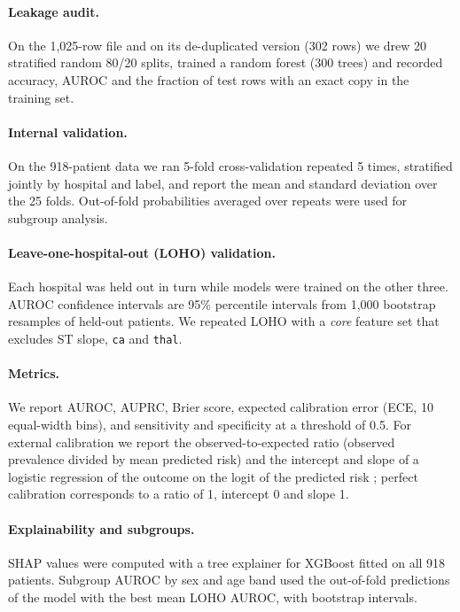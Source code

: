 \documentclass[11pt]{article}
\begin{document}
\paragraph{Leakage audit.} On the 1,025-row file and on its de-duplicated version (302 rows) we drew 20 stratified random 80/20 splits, trained a random forest (300 trees) and recorded accuracy, AUROC and the fraction of test rows with an exact copy in the training set.

\paragraph{Internal validation.} On the 918-patient data we ran 5-fold cross-validation repeated 5 times, stratified jointly by hospital and label, and report the mean and standard deviation over the 25 folds. Out-of-fold probabilities averaged over repeats were used for subgroup analysis.

\paragraph{Leave-one-hospital-out (LOHO) validation.} Each hospital was held out in turn while models were trained on the other three. AUROC confidence intervals are 95\% percentile intervals from 1,000 bootstrap resamples of held-out patients. We repeated LOHO with a \emph{core} feature set that excludes ST slope, \texttt{ca} and \texttt{thal}.

\paragraph{Metrics.} We report AUROC, AUPRC, Brier score, expected calibration error (ECE, 10 equal-width bins), and sensitivity and specificity at a threshold of 0.5. For external calibration we report the observed-to-expected ratio (observed prevalence divided by mean predicted risk) and the intercept and slope of a logistic regression of the outcome on the logit of the predicted risk \citep{vancalster2019calibration}; perfect calibration corresponds to a ratio of 1, intercept 0 and slope 1.

\paragraph{Explainability and subgroups.} SHAP values \citep{lundberg2017shap} were computed with a tree explainer for XGBoost fitted on all 918 patients. Subgroup AUROC by sex and age band used the out-of-fold predictions of the model with the best mean LOHO AUROC, with bootstrap intervals.
\end{document}
